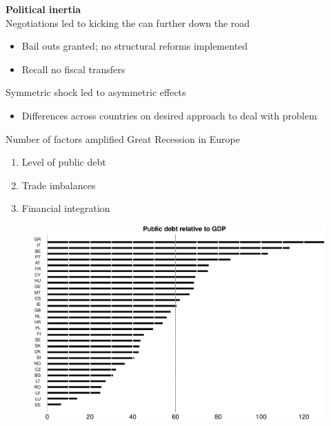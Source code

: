\documentclass{beamer}
\begin{document}
\begin{frame}
  \textbf{Political inertia}\\
  Negotiations led to kicking the can further down the road
  \begin{itemize}
    \item Bail outs granted; no structural reforms implemented
    \item Recall no fiscal transfers
  \end{itemize}
  \medskip
  Symmetric shock led to asymmetric effects
  \begin{itemize}
    \item Differences across countries on desired approach to deal with problem
  \end{itemize}
\end{frame}

\begin{frame}
  Number of factors amplified Great Recession in Europe
  \begin{enumerate}
    \item Level of public debt
    \item Trade imbalances
    \item Financial integration
  \end{enumerate}
\end{frame}

\begin{frame}
  \begin{figure}
    \includegraphics[scale=.3]{public_debt.eps}
  \end{figure}
\end{frame}
\end{document}
